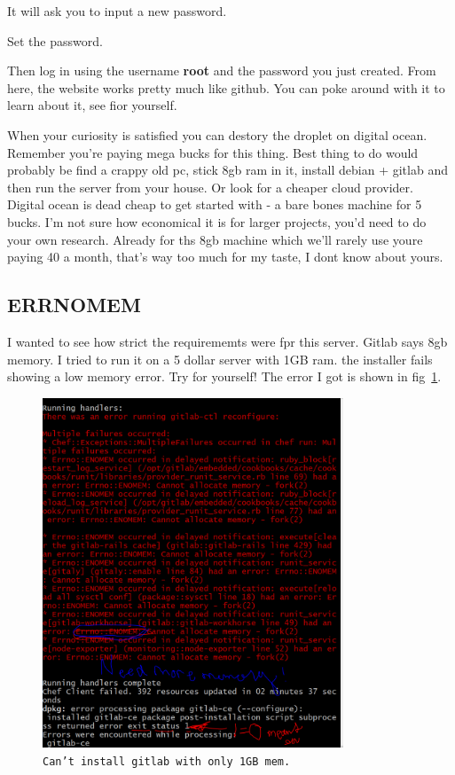 \documentclass[10pt]{article}
\begin{document}
It will ask you to input a new password.

Set the password.

Then log in using the username \textbf{root} and the password you just created.
From here, the website works pretty much like github. You can poke around with
it to learn about it, see fior yourself. 

When your curiosity is satisfied you can destory the droplet on digital ocean.
Remember you're paying mega bucks for this thing. Best thing to do would
probably be find a crappy old pc, stick 8gb ram in it, install debian + gitlab
and then run the server from your house. Or look for a cheaper cloud provider.
Digital ocean is dead cheap to get started with - a bare bones machine for 5
bucks. I'm not sure how economical it is for larger projects, you'd need to do
your own research. Already for ths 8gb machine which we'll rarely use youre
paying 40 a month, that's way too much for my taste, I dont know about yours.


\subsection{ERRNOMEM}

I wanted to see how strict the requirememts were fpr this server. Gitlab says
8gb memory. I tried to run it on a 5 dollar server with 1GB ram. the installer
fails showing a low memory error. Try for yourself! The error I got is shown in
fig~\ref{fig:noMem}.

\begin{figure}[h]
\centering
	\includegraphics[width=0.8\textwidth]{Images/nomemerror.PNG}
	\caption{{\small \texttt{Can't install gitlab with only 1GB mem.}}}
	\label{fig:noMem}
\end{figure}
\end{document}
